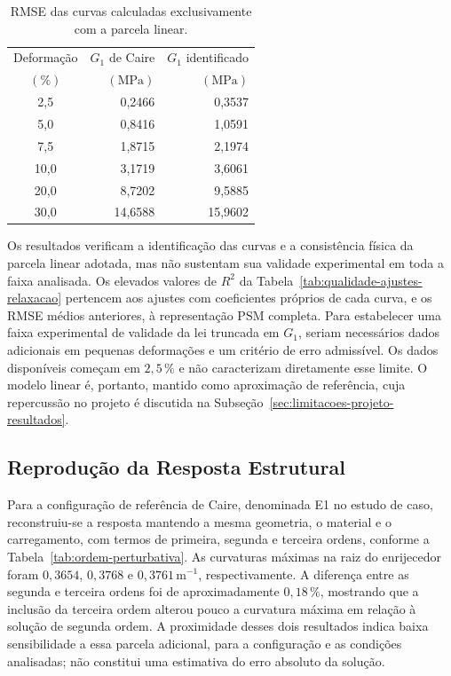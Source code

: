 \documentclass[arial,centeredequations,english,brazilian,oneside,section=TITLE]{ifes8}
\begin{document}
\begin{table}[!htbp]
  \centering
  \caption{RMSE das curvas calculadas exclusivamente com a parcela linear.}
  \label{tab:erro-parcela-linear}
  \begin{tabular}{crr}
    \hline
    Deformação & $G_1$ de Caire & $G_1$ identificado\\
    $(\%)$ & $(\mathrm{MPa})$ & $(\mathrm{MPa})$\\
    \hline
    2,5 & 0,2466 & 0,3537\\
    5,0 & 0,8416 & 1,0591\\
    7,5 & 1,8715 & 2,1974\\
    10,0 & 3,1719 & 3,6061\\
    20,0 & 8,7202 & 9,5885\\
    30,0 & 14,6588 & 15,9602\\
    \hline
  \end{tabular}
\end{table}

Os resultados verificam a identificação das curvas e a consistência
física da parcela linear adotada, mas não sustentam sua validade
experimental em toda a faixa analisada.
Os elevados valores de $R^2$ da
Tabela~\ref{tab:qualidade-ajustes-relaxacao} pertencem aos ajustes com
coeficientes próprios de cada curva, e os RMSE médios anteriores, à
representação PSM completa. Para estabelecer uma faixa experimental de
validade da lei truncada em $G_1$, seriam necessários dados adicionais
em pequenas deformações e um critério de erro admissível. Os dados
disponíveis começam em $2{,}5\,\%$ e não caracterizam diretamente esse
limite. O modelo linear é, portanto, mantido como aproximação de referência,
cuja repercussão no projeto é discutida na
Subseção~\ref{sec:limitacoes-projeto-resultados}.

\subsection{Reprodução da Resposta Estrutural}
\label{sec:reproducao-solucao-estrutural}

Para a configuração de referência de Caire, denominada E1 no estudo de
caso, reconstruiu-se a resposta mantendo a mesma geometria, o material e
o carregamento, com termos de primeira, segunda e terceira
ordens, conforme a Tabela~\ref{tab:ordem-perturbativa}.
As curvaturas máximas na raiz do
enrijecedor foram $0{,}3654$, $0{,}3768$ e
$0{,}3761\,\mathrm{m^{-1}}$, respectivamente. A diferença entre as
segunda e terceira ordens foi de aproximadamente $0{,}18\,\%$, mostrando
que a inclusão da terceira ordem alterou pouco a curvatura máxima em
relação à solução de segunda ordem. A proximidade desses dois resultados
indica baixa sensibilidade a essa parcela adicional, para a configuração
e as condições analisadas; não constitui uma estimativa do erro absoluto
da solução.
\end{document}
